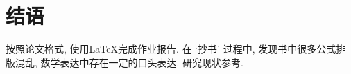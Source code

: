 \section{结语}
按照论文格式, 使用\LaTeX 完成作业报告. 在 `抄书'\citep{article02} 过程中, 发现书中很多公式排版混乱, 数学表达中存在一定的口头表达. 研究现状参考\citep{article01}.